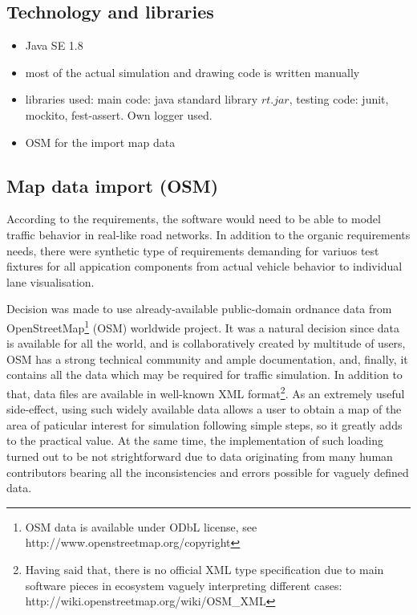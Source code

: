 \subsection{Technology and libraries}
\begin{itemize}
    \item Java SE 1.8
    \item most of the actual simulation and drawing code is written manually
    \item libraries used: main code: java standard library \(rt.jar\), testing code: junit, mockito, fest-assert. Own logger used.
    \item OSM for the import map data
\end{itemize}

\subsection{Map data import (OSM)}
According to the requirements, the software would need to be able to model traffic behavior in real-like road networks. In addition to the organic requirements needs, there were synthetic type of requirements demanding for variuos test fixtures for all appication components from actual vehicle behavior to individual lane visualisation.

Decision was made to use already-available public-domain ordnance data from OpenStreetMap\footnote{OSM data is available under ODbL license, see http://www.openstreetmap.org/copyright} (OSM)  worldwide project. It was a natural decision since data is available for all the world, and is collaboratively created by multitude of users, OSM has a strong technical community and ample documentation, and, finally, it contains all the data which may be required for traffic simulation. In addition to that, data files are available in well-known XML format\footnote{Having said that, there is no official XML type specification due to main software pieces in ecosystem vaguely interpreting different cases: http://wiki.openstreetmap.org/wiki/OSM\_XML}. As an extremely useful side-effect, using such widely available data allows a user to obtain a map of the area of paticular interest for simulation following simple steps, so it greatly adds to the practical value. At the same time, the implementation of such loading turned out to be not strightforward due to data originating from many human contributors bearing all the inconsistencies and errors possible for vaguely defined data.

